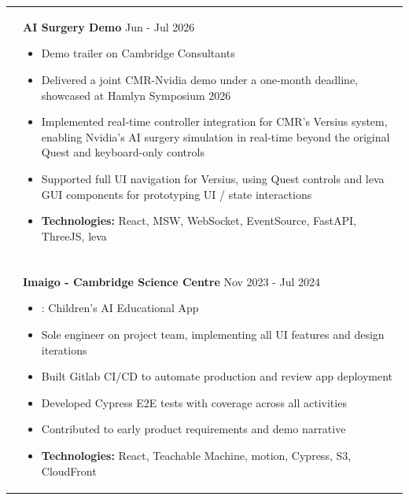 \documentclass[11pt]{article}
\begin{document}
\pagebreak

\begin{minipage}[t][0pt]{\linewidth} %
	\begin{tabular}[t]{p{2cm} p{14cm}}
	               {} &

	               \textbf{AI Surgery Demo}  \hfill Jun - Jul 2026
	               \begin{itemize}
		               \renewcommand{\labelitemi}{$\diamond$}
		               \item Demo trailer on Cambridge Consultants \href{https://www.linkedin.com/posts/cambridge-consultants_medicalrobotics-aiinhealthcare-surgicalrobotics-activity-7478376385166807041-IsAn}{\color{Blue}{LinkedIn Post}}
		               \item Delivered a joint CMR-Nvidia demo under a one-month deadline, showcased at Hamlyn Symposium 2026
		               \item Implemented real-time controller integration for CMR's Versius system, enabling Nvidia's AI surgery simulation in real-time beyond the original Quest and keyboard-only controls
		               \item Supported full UI navigation for Versius, using Quest controls and leva GUI components for prototyping UI / state interactions
		               \item \textbf{Technologies:} React, MSW, WebSocket, EventSource, FastAPI, ThreeJS, leva
	               \end{itemize}

	               \\ & \\ &

	               \textbf{Imaigo - Cambridge Science Centre}  \hfill Nov 2023 - Jul 2024
	               \begin{itemize}
		               \renewcommand{\labelitemi}{$\diamond$}
		               \item \href{https://ifdesign.com/en/winner-ranking/project/imaigo-play-learn-ai/701573}{\color{blue}{iF Design Award 2025 Winner}}: Children's AI Educational App
		               \item Sole engineer on project team, implementing all UI features and design iterations
		               \item Built Gitlab CI/CD to automate production and review app deployment
		               \item Developed Cypress E2E tests with coverage across all activities
		               \item Contributed to early product requirements and demo narrative
		               \item \textbf{Technologies:} React, Teachable Machine, motion, Cypress, S3, CloudFront
	               \end{itemize}


\end{tabular}
\end{minipage}
\end{document}
